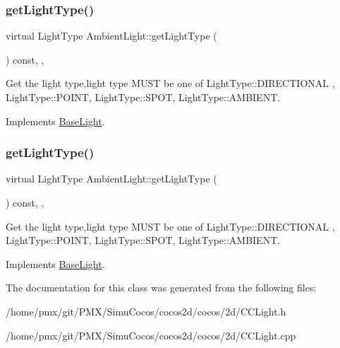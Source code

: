 \subsubsection{\texorpdfstring{get\+Light\+Type()}{getLightType()}\hspace{0.1cm}{\footnotesize\ttfamily [1/2]}}
{\footnotesize\ttfamily virtual Light\+Type Ambient\+Light\+::get\+Light\+Type (\begin{DoxyParamCaption}{ }\end{DoxyParamCaption}) const\hspace{0.3cm}{\ttfamily [inline]}, {\ttfamily [override]}, {\ttfamily [virtual]}}

Get the light type,light type M\+U\+ST be one of Light\+Type\+::\+D\+I\+R\+E\+C\+T\+I\+O\+N\+AL , Light\+Type\+::\+P\+O\+I\+NT, Light\+Type\+::\+S\+P\+OT, Light\+Type\+::\+A\+M\+B\+I\+E\+NT. 

Implements \hyperlink{classBaseLight_a620db25fed828de7328b83587f388030}{Base\+Light}.

\mbox{\label{classAmbientLight_acde40671ef0fa809c5827cf0fefe52a5}} 
\subsubsection{\texorpdfstring{get\+Light\+Type()}{getLightType()}\hspace{0.1cm}{\footnotesize\ttfamily [2/2]}}
{\footnotesize\ttfamily virtual Light\+Type Ambient\+Light\+::get\+Light\+Type (\begin{DoxyParamCaption}{ }\end{DoxyParamCaption}) const\hspace{0.3cm}{\ttfamily [inline]}, {\ttfamily [override]}, {\ttfamily [virtual]}}

Get the light type,light type M\+U\+ST be one of Light\+Type\+::\+D\+I\+R\+E\+C\+T\+I\+O\+N\+AL , Light\+Type\+::\+P\+O\+I\+NT, Light\+Type\+::\+S\+P\+OT, Light\+Type\+::\+A\+M\+B\+I\+E\+NT. 

Implements \hyperlink{classBaseLight_a620db25fed828de7328b83587f388030}{Base\+Light}.



The documentation for this class was generated from the following files\+:\begin{DoxyCompactItemize}
\item 
/home/pmx/git/\+P\+M\+X/\+Simu\+Cocos/cocos2d/cocos/2d/C\+C\+Light.\+h\item 
/home/pmx/git/\+P\+M\+X/\+Simu\+Cocos/cocos2d/cocos/2d/C\+C\+Light.\+cpp\end{DoxyCompactItemize}
